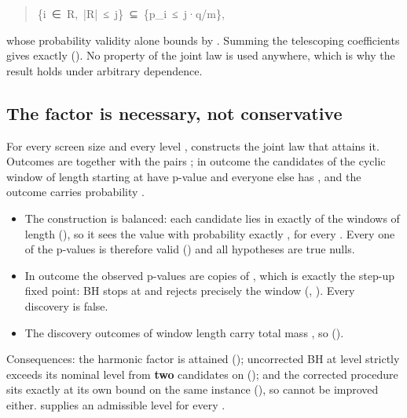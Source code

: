 \begin{quote}\ttfamily\footnotesize\begin{flushleft}
\{i~∈~R,~|R|~≤~j\}~⊆~\{p\_i~≤~j·q/m\},\\
\end{flushleft}\end{quote}

whose probability validity alone bounds by . Summing the telescoping
coefficients gives exactly  (). No property of the joint law is
used anywhere, which is why the result holds under arbitrary dependence.


\subsection*{The factor is necessary, not conservative}

For every screen size  and every level , 
constructs the joint law that attains it. Outcomes are  together with the
pairs ; in outcome  the candidates of the cyclic window of length
 starting at  have p-value  and everyone else has , and the
outcome carries probability .

\begin{itemize}\itemsep1pt \parskip0pt
\item The construction is balanced: each candidate lies in exactly  of the 
  windows of length  (), so it sees the value
   with probability exactly , for every . Every one of the 
  p-values is therefore valid () and all  hypotheses are
  true nulls.
\item In outcome  the observed p-values are  copies of ,
  which is exactly the step-up fixed point: BH stops at  and rejects
  precisely the window (, ). Every discovery is false.
\item The discovery outcomes of window length  carry total mass , so
   ().
\end{itemize}

Consequences: the harmonic factor is attained ();
uncorrected BH at level  strictly exceeds its nominal level from \textbf{two}
candidates on (); and the corrected procedure sits
exactly at its own bound on the same instance (), so
 cannot be improved either.
 supplies an admissible level for every .



